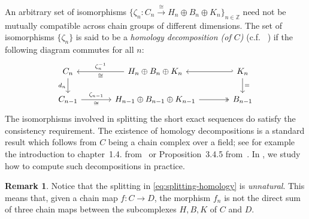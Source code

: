 \documentclass[11pt, table, nothms]{amsart}
\theoremstyle{definition}
\newtheorem{remark}[theorem]{Remark}
\newcommand{\Z}{\mathbb{Z}}
\begin{document}
{An arbitrary set of isomorphisms $\{\zeta_n \colon C_n\xrightarrow{\cong} H_n \oplus B_n \oplus K_n\}_{n \in \Z}$ need not be mutually compatible across chain groups of different dimensions. The set of isomorphisms $\{\zeta_n\}$ is said to be a \emph{homology decomposition (of $C$)} (c.f. ~\cite[Prop~3.4.5.]{Mrozek2025ConnectionDynamics}) if the following diagram commutes for all $n$:
    \begin{equation}
    \begin{tikzcd}[column sep=large]
	{C_n} & {H_n \oplus B_n \oplus K_n } & {K_n} \\
	{C_{n-1}} & {H_{n-1} \oplus B_{n-1} \oplus K_{n-1} } &  B_{n-1}
	\arrow["{\zeta_n^{-1}}"',"\cong", from=1-2, to=1-1]
	\arrow["{d_n}"', from=1-1, to=2-1]
	\arrow[hook', from=1-3, to=1-2]
	\arrow["{\zeta_{n-1}}","\cong"',  from=2-1, to=2-2]
	\arrow["=", from=1-3, to=2-3]
    \arrow[two heads,  from=2-2, to=2-3]
\end{tikzcd} \label{eq:homology-decomposition}
\end{equation}
The isomorphisms involved in splitting the short exact sequences do satisfy the consistency requirement. 
The existence of homology decompositions is a standard result which follows from $C$ being a chain complex over a field; see for example the introduction to chapter~1.4. from~\cite{Weibel1994AnAlgebra} or Proposition~3.4.5 from~\cite{Mrozek2025ConnectionDynamics}.
In , we study how to compute such decompositions in practice.
\begin{remark}
    Notice that the splitting in \cref{eq:splitting-homology} is \emph{unnatural}.
    This means that, given a chain map $f\colon C \rightarrow D$, the morphism $f_n$ is not the direct sum of three chain maps between the subcomplexes $H, B, K$ of $C$ and $D$. 
\end{remark}


}
\end{document}
